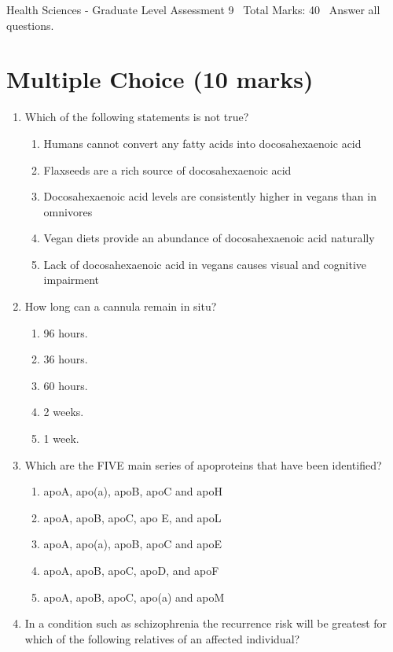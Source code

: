 \documentclass[12pt]{article}
\begin{document}
\begin{center}
Health Sciences - Graduate Level Assessment 9 \
Total Marks: 40 \
Answer all questions.
\end{center}

\section*{Multiple Choice (10 marks)}
\begin{enumerate}[label=\arabic*.]
\item Which of the following statements is not true?
\begin{enumerate}[label=(\alph*)]
    \item Humans cannot convert any fatty acids into docosahexaenoic acid
    \item Flaxseeds are a rich source of docosahexaenoic acid
    \item Docosahexaenoic acid levels are consistently higher in vegans than in omnivores
    \item Vegan diets provide an abundance of docosahexaenoic acid naturally
    \item Lack of docosahexaenoic acid in vegans causes visual and cognitive impairment
\end{enumerate}
\item How long can a cannula remain in situ?
\begin{enumerate}[label=(\alph*)]
    \item 96 hours.
    \item 36 hours.
    \item 60 hours.
    \item 2 weeks.
    \item 1 week.
\end{enumerate}
\item Which are the FIVE main series of apoproteins that have been identified?
\begin{enumerate}[label=(\alph*)]
    \item apoA, apo(a), apoB, apoC and apoH
    \item apoA, apoB, apoC, apo E, and apoL
    \item apoA, apo(a), apoB, apoC and apoE
    \item apoA, apoB, apoC, apoD, and apoF
    \item apoA, apoB, apoC, apo(a) and apoM
\end{enumerate}
\item In a condition such as schizophrenia the recurrence risk will be greatest for which of the following relatives of an affected individual?

\end{enumerate}
\end{document}
